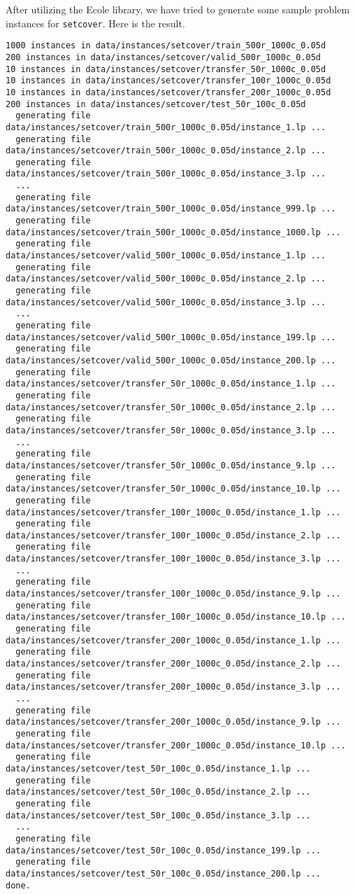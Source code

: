 After utilizing the Ecole library, we have tried to generate some sample problem instances for \texttt{setcover}. Here is the result.
\begin{lstlisting}[style=DOS]
1000 instances in data/instances/setcover/train_500r_1000c_0.05d
200 instances in data/instances/setcover/valid_500r_1000c_0.05d
10 instances in data/instances/setcover/transfer_50r_1000c_0.05d
10 instances in data/instances/setcover/transfer_100r_1000c_0.05d
10 instances in data/instances/setcover/transfer_200r_1000c_0.05d
200 instances in data/instances/setcover/test_50r_100c_0.05d
  generating file data/instances/setcover/train_500r_1000c_0.05d/instance_1.lp ...
  generating file data/instances/setcover/train_500r_1000c_0.05d/instance_2.lp ...
  generating file data/instances/setcover/train_500r_1000c_0.05d/instance_3.lp ...
  ...
  generating file data/instances/setcover/train_500r_1000c_0.05d/instance_999.lp ...
  generating file data/instances/setcover/train_500r_1000c_0.05d/instance_1000.lp ...
  generating file data/instances/setcover/valid_500r_1000c_0.05d/instance_1.lp ...
  generating file data/instances/setcover/valid_500r_1000c_0.05d/instance_2.lp ...
  generating file data/instances/setcover/valid_500r_1000c_0.05d/instance_3.lp ...
  ...
  generating file data/instances/setcover/valid_500r_1000c_0.05d/instance_199.lp ...
  generating file data/instances/setcover/valid_500r_1000c_0.05d/instance_200.lp ...
  generating file data/instances/setcover/transfer_50r_1000c_0.05d/instance_1.lp ...
  generating file data/instances/setcover/transfer_50r_1000c_0.05d/instance_2.lp ...
  generating file data/instances/setcover/transfer_50r_1000c_0.05d/instance_3.lp ...
  ...
  generating file data/instances/setcover/transfer_50r_1000c_0.05d/instance_9.lp ...
  generating file data/instances/setcover/transfer_50r_1000c_0.05d/instance_10.lp ...
  generating file data/instances/setcover/transfer_100r_1000c_0.05d/instance_1.lp ...
  generating file data/instances/setcover/transfer_100r_1000c_0.05d/instance_2.lp ...
  generating file data/instances/setcover/transfer_100r_1000c_0.05d/instance_3.lp ...
  ...
  generating file data/instances/setcover/transfer_100r_1000c_0.05d/instance_9.lp ...
  generating file data/instances/setcover/transfer_100r_1000c_0.05d/instance_10.lp ...
  generating file data/instances/setcover/transfer_200r_1000c_0.05d/instance_1.lp ...
  generating file data/instances/setcover/transfer_200r_1000c_0.05d/instance_2.lp ...
  generating file data/instances/setcover/transfer_200r_1000c_0.05d/instance_3.lp ...
  ...
  generating file data/instances/setcover/transfer_200r_1000c_0.05d/instance_9.lp ...
  generating file data/instances/setcover/transfer_200r_1000c_0.05d/instance_10.lp ...
  generating file data/instances/setcover/test_50r_100c_0.05d/instance_1.lp ...
  generating file data/instances/setcover/test_50r_100c_0.05d/instance_2.lp ...
  generating file data/instances/setcover/test_50r_100c_0.05d/instance_3.lp ...
  ...
  generating file data/instances/setcover/test_50r_100c_0.05d/instance_199.lp ...
  generating file data/instances/setcover/test_50r_100c_0.05d/instance_200.lp ...
done.
\end{lstlisting}